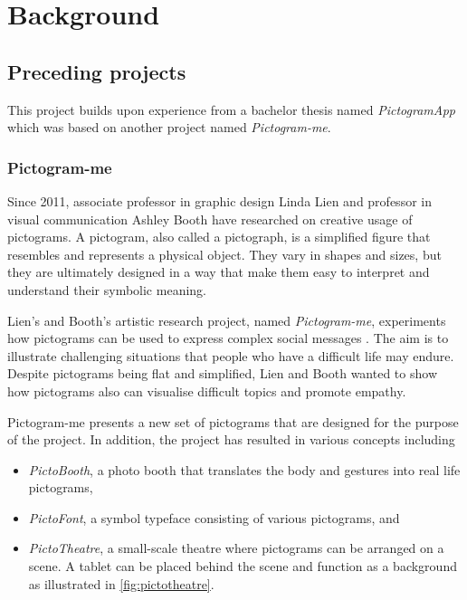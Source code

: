 \chapter{Background}
\label{ch:background}

\section{Preceding projects}

This project builds upon experience from a bachelor thesis named \emph{PictogramApp} which was based on another project named \emph{Pictogram-me}.

\subsection{Pictogram-me}

Since 2011, associate professor in graphic design Linda Lien and professor in visual communication Ashley Booth have researched on creative usage of pictograms. A pictogram, also called a pictograph, is a simplified figure that resembles and represents a physical object. They vary in shapes and sizes, but they are ultimately designed in a way that make them easy to interpret and understand their symbolic meaning.

Lien's and Booth's artistic research project, named \emph{Pictogram-me}, experiments how pictograms can be used to express complex social messages \parencite{lien2018}. The aim is to illustrate challenging situations that people who have a difficult life may endure. Despite pictograms being flat and simplified, Lien and Booth wanted to show how pictograms also can visualise difficult topics and promote empathy.

Pictogram-me presents a new set of pictograms that are designed for the purpose of the project. In addition, the project has resulted in various concepts including

\begin{itemize}
    \item \emph{PictoBooth}, a photo booth that translates the body and gestures into real life pictograms,
    \item \emph{PictoFont}, a symbol typeface consisting of various pictograms, and
    \item \emph{PictoTheatre}, a small-scale theatre where pictograms can be arranged on a scene. A tablet can be placed behind the scene and function as a background as illustrated in \ref{fig:pictotheatre}.
\end{itemize}


